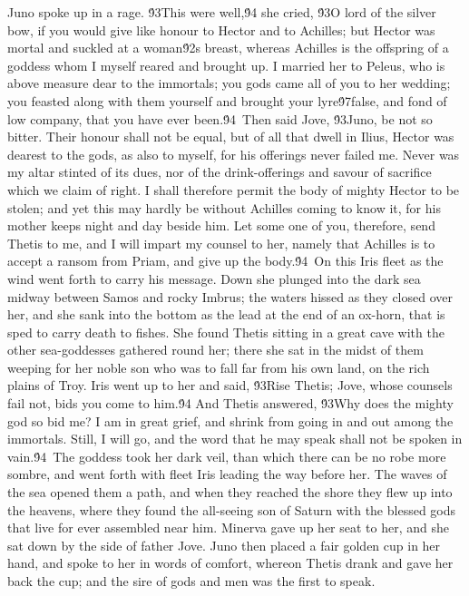 {Juno spoke up in a rage. \'93This were well,\'94 she cried, \'93O lord of the silver bow, if you would give like honour to Hector and to Achilles; but Hector was mortal and suckled at a woman\'92s breast, whereas Achilles is the offspring of a goddess whom I myself reared and brought up. I married her to Peleus, who is above measure dear to the immortals; you gods came all of you to her wedding; you feasted along with them yourself and brought your lyre\'97false, and fond of low company, that you have ever been.\'94\
Then said Jove, \'93Juno, be not so bitter. Their honour shall not be equal, but of all that dwell in Ilius, Hector was dearest to the gods, as also to myself, for his offerings never failed me. Never was my altar stinted of its dues, nor of the drink-offerings and savour of sacrifice which we claim of right. I shall therefore permit the body of mighty Hector to be stolen; and yet this may hardly be without Achilles coming to know it, for his mother keeps night and day beside him. Let some one of you, therefore, send Thetis to me, and I will impart my counsel to her, namely that Achilles is to accept a ransom from Priam, and give up the body.\'94\
On this Iris fleet as the wind went forth to carry his message. Down she plunged into the dark sea midway between Samos and rocky Imbrus; the waters hissed as they closed over her, and she sank into the bottom as the lead at the end of an ox-horn, that is sped to carry death to fishes. She found Thetis sitting in a great cave with the other sea-goddesses gathered round her; there she sat in the midst of them weeping for her noble son who was to fall far from his own land, on the rich plains of Troy. Iris went up to her and said, \'93Rise Thetis; Jove, whose counsels fail not, bids you come to him.\'94 And Thetis answered, \'93Why does the mighty god so bid me? I am in great grief, and shrink from going in and out among the immortals. Still, I will go, and the word that he may speak shall not be spoken in vain.\'94\
The goddess took her dark veil, than which there can be no robe more sombre, and went forth with fleet Iris leading the way before her. The waves of the sea opened them a path, and when they reached the shore they flew up into the heavens, where they found the all-seeing son of Saturn with the blessed gods that live for ever assembled near him. Minerva gave up her seat to her, and she sat down by the side of father Jove. Juno then placed a fair golden cup in her hand, and spoke to her in words of comfort, whereon Thetis drank and gave her back the cup; and the sire of gods and men was the first to speak.\
}
